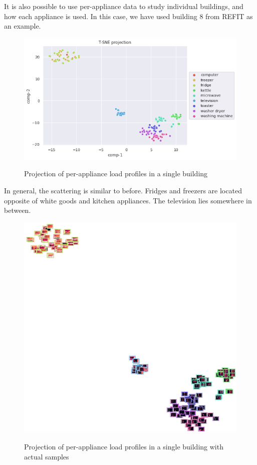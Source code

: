 It is also possible to use per-appliance data to study
individual buildings, and how each appliance is used.
In this case, we have used building 8 from REFIT as an example.

\begin{figure}[H]
	\centering
	\caption{Projection of per-appliance load profiles in a single building}
	\includegraphics[width=.8\textwidth]{Figures/TSNE/TSNE_results/refit/scatter_refit_8.png}
	\label{fig:tsne_papb_scatter_ent_refit8}
\end{figure}

In general, the scattering is similar to before.
Fridges and freezers are located opposite of white goods and kitchen appliances. 
The television lies somewhere in between. 

\begin{figure}[H]
	\centering
	\caption{Projection of per-appliance load profiles in a single building with actual samples}
	\includegraphics[width=.9\textwidth]{Figures/TSNE/TSNE_results/refit/img_scatter_refit8.png}
	\label{fig:tsne_papb_img_scatter_ent_refit8}
\end{figure}

